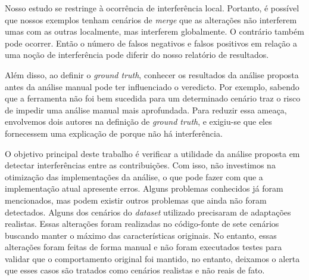 Nosso estudo se restringe à ocorrência de interferência local. Portanto, é possível que nossos exemplos tenham cenários de \emph{merge} que as alterações não interferem umas com as outras localmente, mas interferem globalmente. O contrário também pode ocorrer. Então o número de falsos negativos e falsos positivos em relação a uma noção de interferência pode diferir do nosso relatório de resultados.



Além disso, ao definir o \emph{ground truth}, conhecer os resultados da análise proposta antes da análise manual pode ter influenciado o veredicto. Por exemplo,
sabendo que a ferramenta não foi bem sucedida para um determinado cenário traz o risco de impedir uma análise manual mais aprofundada. Para reduzir essa ameaça, envolvemos dois autores na definição de \emph{ground truth}, e exigiu-se que eles fornecessem uma explicação de porque não há interferência. 


O objetivo principal deste trabalho é verificar a utilidade da análise proposta em detectar interferências entre as contribuições. Com isso, não investimos na otimização das implementações da análise, o que pode fazer com que a implementação atual apresente erros. Alguns problemas conhecidos já foram mencionados, mas podem existir outros problemas que ainda não foram detectados. 
Alguns dos cenários do \emph{dataset} utilizado precisaram de adaptações realistas. Essas alterações foram realizadas no código-fonte de sete cenários buscando manter o máximo das características originais. No entanto, essas alterações foram feitas de forma manual e não foram executados testes para validar que o comportamento original foi mantido, no entanto, deixamos o alerta que esses casos são tratados como cenários realistas e não reais de fato.

